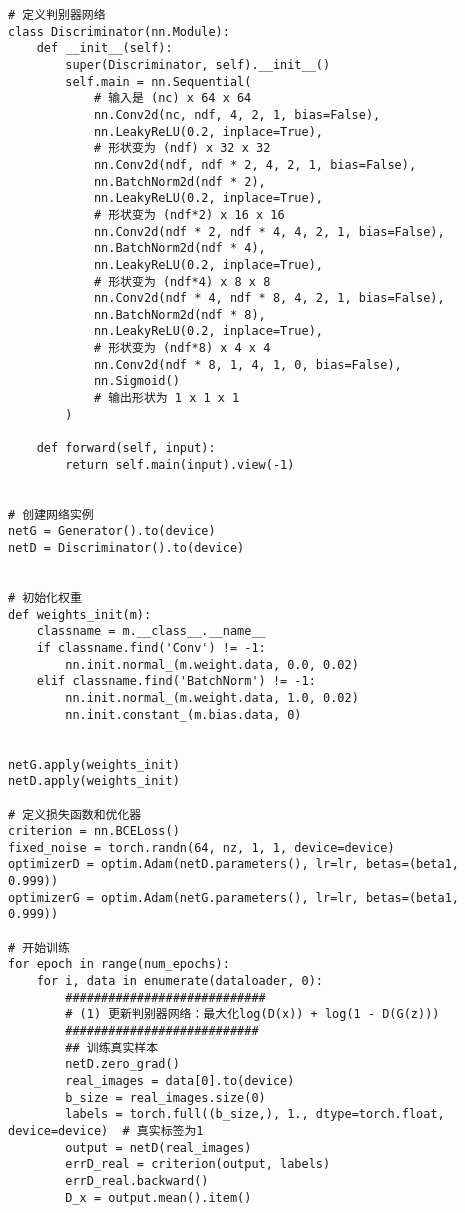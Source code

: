 \begin{lstlisting}
# 定义判别器网络
class Discriminator(nn.Module):
    def __init__(self):
        super(Discriminator, self).__init__()
        self.main = nn.Sequential(
            # 输入是 (nc) x 64 x 64
            nn.Conv2d(nc, ndf, 4, 2, 1, bias=False),
            nn.LeakyReLU(0.2, inplace=True),
            # 形状变为 (ndf) x 32 x 32
            nn.Conv2d(ndf, ndf * 2, 4, 2, 1, bias=False),
            nn.BatchNorm2d(ndf * 2),
            nn.LeakyReLU(0.2, inplace=True),
            # 形状变为 (ndf*2) x 16 x 16
            nn.Conv2d(ndf * 2, ndf * 4, 4, 2, 1, bias=False),
            nn.BatchNorm2d(ndf * 4),
            nn.LeakyReLU(0.2, inplace=True),
            # 形状变为 (ndf*4) x 8 x 8
            nn.Conv2d(ndf * 4, ndf * 8, 4, 2, 1, bias=False),
            nn.BatchNorm2d(ndf * 8),
            nn.LeakyReLU(0.2, inplace=True),
            # 形状变为 (ndf*8) x 4 x 4
            nn.Conv2d(ndf * 8, 1, 4, 1, 0, bias=False),
            nn.Sigmoid()
            # 输出形状为 1 x 1 x 1
        )

    def forward(self, input):
        return self.main(input).view(-1)


# 创建网络实例
netG = Generator().to(device)
netD = Discriminator().to(device)


# 初始化权重
def weights_init(m):
    classname = m.__class__.__name__
    if classname.find('Conv') != -1:
        nn.init.normal_(m.weight.data, 0.0, 0.02)
    elif classname.find('BatchNorm') != -1:
        nn.init.normal_(m.weight.data, 1.0, 0.02)
        nn.init.constant_(m.bias.data, 0)


netG.apply(weights_init)
netD.apply(weights_init)

# 定义损失函数和优化器
criterion = nn.BCELoss()
fixed_noise = torch.randn(64, nz, 1, 1, device=device)
optimizerD = optim.Adam(netD.parameters(), lr=lr, betas=(beta1, 0.999))
optimizerG = optim.Adam(netG.parameters(), lr=lr, betas=(beta1, 0.999))

# 开始训练
for epoch in range(num_epochs):
    for i, data in enumerate(dataloader, 0):
        ############################
        # (1) 更新判别器网络：最大化log(D(x)) + log(1 - D(G(z)))
        ###########################
        ## 训练真实样本
        netD.zero_grad()
        real_images = data[0].to(device)
        b_size = real_images.size(0)
        labels = torch.full((b_size,), 1., dtype=torch.float, device=device)  # 真实标签为1
        output = netD(real_images)
        errD_real = criterion(output, labels)
        errD_real.backward()
        D_x = output.mean().item()


\end{lstlisting}
